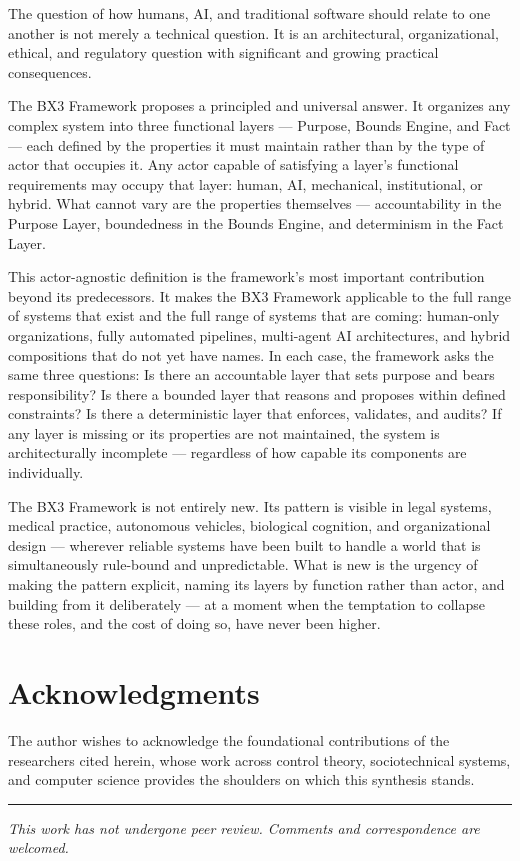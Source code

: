 \documentclass[12pt]{article}
\begin{document}
The question of how humans, AI, and traditional software should relate to one another is not merely a technical question. It is an architectural, organizational, ethical, and regulatory question with significant and growing practical consequences.

The BX3 Framework proposes a principled and universal answer. It organizes any complex system into three functional layers --- Purpose, Bounds Engine, and Fact --- each defined by the properties it must maintain rather than by the type of actor that occupies it. Any actor capable of satisfying a layer's functional requirements may occupy that layer: human, AI, mechanical, institutional, or hybrid. What cannot vary are the properties themselves --- accountability in the Purpose Layer, boundedness in the Bounds Engine, and determinism in the Fact Layer.

This actor-agnostic definition is the framework's most important contribution beyond its predecessors. It makes the BX3 Framework applicable to the full range of systems that exist and the full range of systems that are coming: human-only organizations, fully automated pipelines, multi-agent AI architectures, and hybrid compositions that do not yet have names. In each case, the framework asks the same three questions: Is there an accountable layer that sets purpose and bears responsibility? Is there a bounded layer that reasons and proposes within defined constraints? Is there a deterministic layer that enforces, validates, and audits? If any layer is missing or its properties are not maintained, the system is architecturally incomplete --- regardless of how capable its components are individually.

The BX3 Framework is not entirely new. Its pattern is visible in legal systems, medical practice, autonomous vehicles, biological cognition, and organizational design --- wherever reliable systems have been built to handle a world that is simultaneously rule-bound and unpredictable. What is new is the urgency of making the pattern explicit, naming its layers by function rather than actor, and building from it deliberately --- at a moment when the temptation to collapse these roles, and the cost of doing so, have never been higher.

\section*{Acknowledgments}

The author wishes to acknowledge the foundational contributions of the researchers cited herein, whose work across control theory, sociotechnical systems, and computer science provides the shoulders on which this synthesis stands.




\vspace{2em}
\hrule
\vspace{0.5em}
\noindent\small\textit{This work has not undergone peer review. Comments and correspondence are welcomed.}
\end{document}

